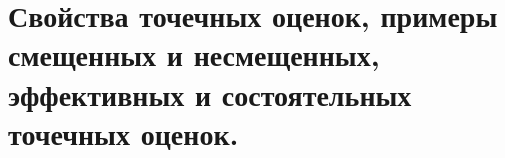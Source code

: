 \documentclass[polytech/stats/exam-2023/stats-exam-2023.tex]{subfiles}
\begin{document}
\section{Свойства точечных оценок, примеры смещенных и несмещенных, эффективных и состоятельных точечных оценок.}
\end{document}
